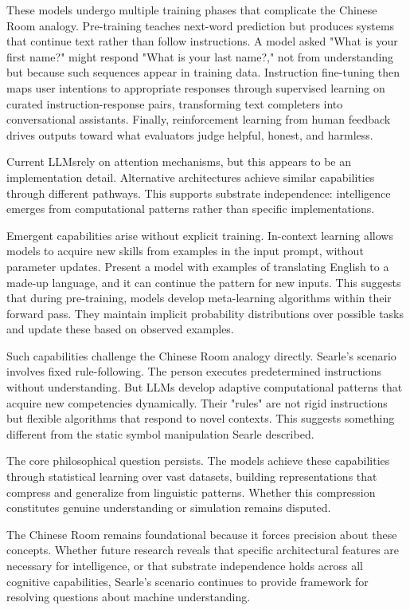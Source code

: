 These models undergo multiple training phases that complicate the Chinese Room analogy. Pre-training teaches next-word prediction but produces systems that continue text rather than follow instructions. A model asked "What is your first name?" might respond "What is your last name?," not from understanding but because such sequences appear in training data. Instruction fine-tuning then maps user intentions to appropriate responses through supervised learning on curated instruction-response pairs, transforming text completers into conversational assistants. Finally, reinforcement learning from human feedback drives outputs toward what evaluators judge helpful, honest, and harmless.

Current LLMsrely on attention mechanisms, but this appears to be an implementation detail. Alternative architectures achieve similar capabilities through different pathways. This supports substrate independence: intelligence emerges from computational patterns rather than specific implementations.

Emergent capabilities arise without explicit training. In-context learning allows models to acquire new skills from examples in the input prompt, without parameter updates. Present a model with examples of translating English to a made-up language, and it can continue the pattern for new inputs. This suggests that during pre-training, models develop meta-learning algorithms within their forward pass. They maintain implicit probability distributions over possible tasks and update these based on observed examples.

Such capabilities challenge the Chinese Room analogy directly. Searle's scenario involves fixed rule-following. The person executes predetermined instructions without understanding. But LLMs develop adaptive computational patterns that acquire new competencies dynamically. Their "rules" are not rigid instructions but flexible algorithms that respond to novel contexts. This suggests something different from the static symbol manipulation Searle described.

The core philosophical question persists. The models achieve these capabilities through statistical learning over vast datasets, building representations that compress and generalize from linguistic patterns. Whether this compression constitutes genuine understanding or simulation remains disputed.

The Chinese Room remains foundational because it forces precision about these concepts. Whether future research reveals that specific architectural features are necessary for intelligence, or that substrate independence holds across all cognitive capabilities, Searle's scenario continues to provide framework for resolving questions about machine understanding.

